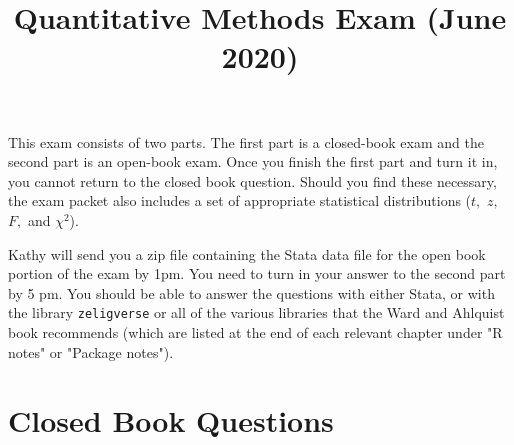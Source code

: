 \documentclass[12pt]{article}
\title{Quantitative Methods Exam (June 2020)}
\date{} %
\begin{document}
\maketitle

This exam consists of two parts. The first part is a closed-book exam and the second part is an open-book exam. Once you finish the first part and turn it in, you cannot return to the closed book question. Should you find these necessary, the exam packet also includes a set of appropriate statistical distributions ($t,$ $z,$ $F,$ and $\chi^2$).

Kathy will send you a zip file containing the Stata data file for the open book portion of the exam by 1pm. You need to turn in your answer to the second part by 5 pm. You should be able to answer the questions with either Stata, or with the library {\tt zeligverse} or all of the various libraries that the Ward and Ahlquist book recommends (which are listed at the end of each relevant chapter under "R notes" or "Package notes").

\section{Closed Book Questions}
\end{document}
